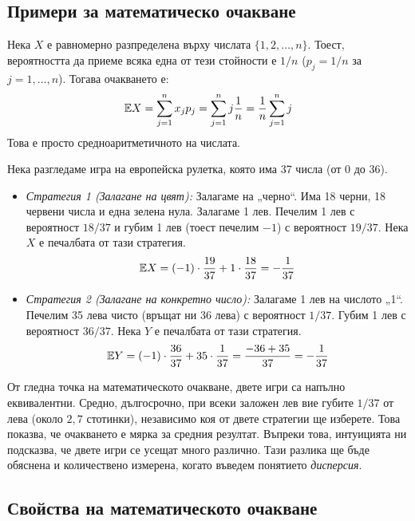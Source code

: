 \subsection{Примери за математическо очакване}

\begin{example}\label{ex:05-2}
Нека $X$ е равномерно разпределена върху числата $\{1, 2, \dots, n\}$. Тоест, вероятността да приеме всяка една от тези стойности е $1/n$ ($p_j = 1/n$ за $j=1,\dots,n$).
Тогава очакването е:
\[ \mathbb{E} X = \sum_{j=1}^n x_j p_j = \sum_{j=1}^n j \frac{1}{n} = \frac{1}{n} \sum_{j=1}^n j \]
Това е просто средноаритметичното на числата.

\end{example}

\begin{example}\label{ex:05-3}
Нека разгледаме игра на европейска рулетка, която има 37 числа (от 0 до 36).
\begin{itemize}
    \item \emph{Стратегия 1 (Залагане на цвят):} Залагаме на „черно“. Има 18 черни, 18 червени числа и една зелена нула. Залагаме 1 лев. Печелим 1 лев с вероятност $18/37$ и губим 1 лев (тоест печелим $-1$) с вероятност $19/37$. Нека $X$ е печалбата от тази стратегия.
    \[ \mathbb{E} X = (-1) \cdot \frac{19}{37} + 1 \cdot \frac{18}{37} = -\frac{1}{37} \]

    \item \emph{Стратегия 2 (Залагане на конкретно число):} Залагаме 1 лев на числото „1“. Печелим 35 лева чисто (връщат ни 36 лева) с вероятност $1/37$. Губим 1 лев с вероятност $36/37$. Нека $Y$ е печалбата от тази стратегия.
    \[ \mathbb{E} Y = (-1) \cdot \frac{36}{37} + 35 \cdot \frac{1}{37} = \frac{-36 + 35}{37} = -\frac{1}{37} \]
\end{itemize}

От гледна точка на математическото очакване, двете игри са напълно еквивалентни. Средно, дългосрочно, при всеки заложен лев вие губите $1/37$ от лева (около $2{,}7$ стотинки), независимо коя от двете стратегии ще изберете. Това показва, че очакването е мярка за средния резултат. Въпреки това, интуицията ни подсказва, че двете игри се усещат много различно. Тази разлика ще бъде обяснена и количествено измерена, когато въведем понятието \emph{дисперсия}.

\end{example}

\subsection{Свойства на математическото очакване}

